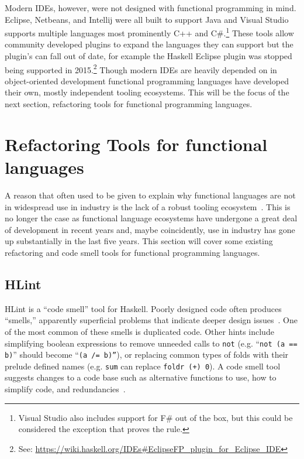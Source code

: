 Modern IDEs, however, were not designed with functional programming in mind. Eclipse, Netbeans, and Intellij were all built to support Java and Visual Studio supports multiple languages most prominently C++ and C\#.\footnote{Visual Studio also includes support for F\# out of the box, but this could be considered the exception that proves the rule.} These tools allow community developed plugins to expand the languages they can support but the plugin's can fall out of date, for example the Haskell Eclipse plugin was stopped being supported in 2015.\footnote{See: \url{https://wiki.haskell.org/IDEs\#EclipseFP_plugin_for_Eclipse_IDE}} Though modern IDEs are heavily depended on in object-oriented development functional programming languages have developed their own, mostly independent tooling ecosystems. This will be the focus of the next section, refactoring tools for functional programming languages.

\section{Refactoring Tools for functional languages}\label{funcTools}
A reason that often used to be given to explain why functional languages are not in widespread use in industry is the lack of a robust tooling ecosystem~\citep{wadlerTools}. This is no longer the case as functional language ecosystems have undergone a great deal of development in recent years and, maybe coincidently, use in industry has gone up substantially in the last five years. This section will cover some existing refactoring and code smell tools for functional programming languages.

\subsection{HLint}

HLint is a ``code smell'' tool for Haskell. Poorly designed code often produces ``smells,'' apparently superficial problems that indicate deeper design issues~\citep{fowler}. One of the most common of these smells is duplicated code. Other hints include simplifying boolean expressions to remove unneeded calls to \texttt{not} (e.g. ``\texttt{not (a == b)}'' should become ``\texttt{(a /= b)''}), or replacing common types of folds with their prelude defined names (e.g. \texttt{sum} can replace \texttt{foldr (+) 0}). A code smell tool suggests changes to a code base such as alternative functions to use, how to simplify code, and redundancies~\citep{hlint}.

